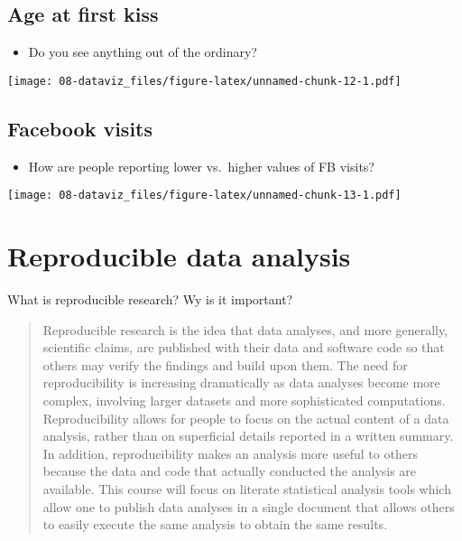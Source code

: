 \documentclass[
]{book}
\providecommand{\tightlist}{%
  \setlength{\itemsep}{0pt}\setlength{\parskip}{0pt}}
\theoremstyle{definition}
\theoremstyle{definition}
\theoremstyle{definition}
\theoremstyle{definition}
\theoremstyle{remark}
\begin{document}
\hypertarget{age-at-first-kiss}{%
\section{Age at first kiss}\label{age-at-first-kiss}}

\begin{itemize}
\tightlist
\item
  Do you see anything out of the ordinary?
\end{itemize}

\texttt{[image: 08-dataviz\_files/figure-latex/unnamed-chunk-12-1.pdf]}

\hypertarget{facebook-visits}{%
\section{Facebook visits}\label{facebook-visits}}

\begin{itemize}
\tightlist
\item
  How are people reporting lower vs.~higher values of FB visits?
\end{itemize}

\texttt{[image: 08-dataviz\_files/figure-latex/unnamed-chunk-13-1.pdf]}

\hypertarget{reproducible-data-analysis}{%
\chapter{Reproducible data analysis}\label{reproducible-data-analysis}}

What is reproducible research? Wy is it important?

\begin{quote}
Reproducible research is the idea that data analyses, and more generally, scientific claims, are published with their data and software code so that others may verify the findings and build upon them. The need for reproducibility is increasing dramatically as data analyses become more complex, involving larger datasets and more sophisticated computations. Reproducibility allows for people to focus on the actual content of a data analysis, rather than on superficial details reported in a written summary. In addition, reproducibility makes an analysis more useful to others because the data and code that actually conducted the analysis are available. This course will focus on literate statistical analysis tools which allow one to publish data analyses in a single document that allows others to easily execute the same analysis to obtain the same results.
\end{quote}
\end{document}
